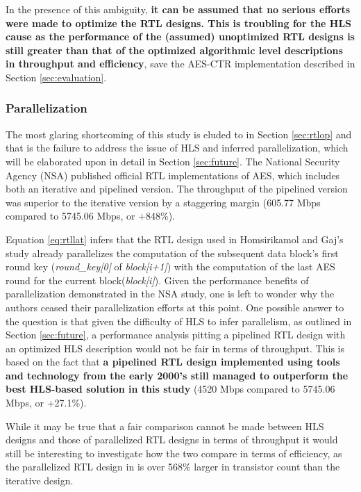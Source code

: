 \documentclass[12pt,journal,compsoc,onecolumn]{IEEEtran}
\begin{document}
In the presence of this ambiguity, \textbf{it can be assumed that no serious efforts were made to optimize the RTL designs. This is troubling for the HLS cause as the performance of the (assumed) unoptimized RTL designs is still greater than that of the optimized algorithmic level descriptions in throughput and efficiency}, save the AES-CTR implementation described in Section \ref{sec:evaluation}.

\subsubsection{Parallelization}\label{sec:parallel}
The most glaring shortcoming of this study is eluded to in Section \ref{sec:rtlop} and that is the failure to address the issue of HLS and inferred parallelization, which will be elaborated upon in detail in Section \ref{sec:future}. The National Security Agency (NSA) published official RTL implementations of AES, which includes both an iterative and pipelined version\cite{nsa}. The throughput of the pipelined version was superior to the iterative version by a staggering margin (605.77 Mbps compared to 5745.06 Mbps, or +848\%)\cite{nsaweeks}.

Equation \ref{eq:rtllat} infers that the RTL design used in Homsirikamol and Gaj's study already parallelizes the computation of the subsequent data block's first round key (\emph{round\_key[0]} of \emph{block[i+1]}) with the computation of the last AES round for the current block(\emph{block[i]}). Given the performance benefits of parallelization demonstrated in the NSA study, one is left to wonder why the authors ceased their parallelization efforts at this point. One possible answer to the question is that given the difficulty of HLS to infer parallelism, as outlined in Section \ref{sec:future}, a performance analysis pitting a pipelined RTL design with an optimized HLS description would not be fair in terms of throughput. This is based on the fact that \textbf{a pipelined RTL design implemented using tools and technology from the early 2000's still managed to outperform the best HLS-based solution in this study} (4520 Mbps compared to 5745.06 Mbps\cite{nsaweeks}, or +27.1\%). 

While it may be true that a fair comparison cannot be made between HLS designs and those of parallelized RTL designs in terms of throughput it would still be interesting to investigate how the two compare in terms of efficiency, as the parallelized RTL design in \cite{nsaweeks} is over 568\% larger in transistor count than the iterative design. 
\end{document}
